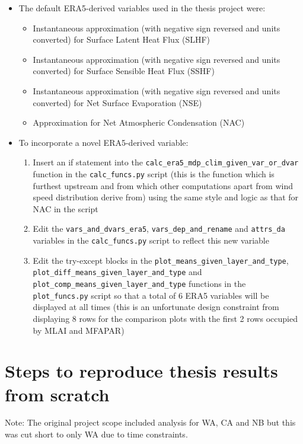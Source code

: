 \begin{itemize}
	\item The default ERA5-derived variables used in the thesis project were: 
	\begin{itemize}
		\item Instantaneous approximation (with negative sign reversed and units converted) for Surface Latent Heat Flux (SLHF)
		\item Instantaneous approximation (with negative sign reversed and units converted) for Surface Sensible Heat Flux (SSHF)
		\item Instantaneous approximation (with negative sign reversed and units converted) for Net Surface Evaporation (NSE)
		\item Approximation for Net Atmospheric Condensation (NAC)
	\end{itemize}
	\item To incorporate a novel ERA5-derived variable:
	\begin{enumerate}
		\item Insert an if statement into the \verb+calc_era5_mdp_clim_given_var_or_dvar+ function in the \verb+calc_funcs.py+ script (this is the function which is furthest upstream and from which other computations apart from wind speed distribution derive from) using the same style and logic as that for NAC in the script
		\item Edit the \verb+vars_and_dvars_era5+, \verb+vars_dep_and_rename+ and \verb+attrs_da+ variables in the \verb+calc_funcs.py+ script to reflect this new variable
		\item Edit the try-except blocks in the \verb+plot_means_given_layer_and_type+, \verb+plot_diff_means_given_layer_and_type+ and \\ \verb+plot_comp_means_given_layer_and_type+ functions in the \\ \verb+plot_funcs.py+ script so that a total of 6 ERA5 variables will be displayed at all times (this is an unfortunate design constraint from displaying 8 rows for the comparison plots with the first 2 rows occupied by MLAI and MFAPAR)
	\end{enumerate}
\end{itemize}

\section[Steps to reproduce thesis]{Steps to reproduce thesis results from scratch}

Note: The original project scope included analysis for \ac{WA}, \ac{CA} and \ac{NB} but this was cut short to only \ac{WA} due to time constraints.

